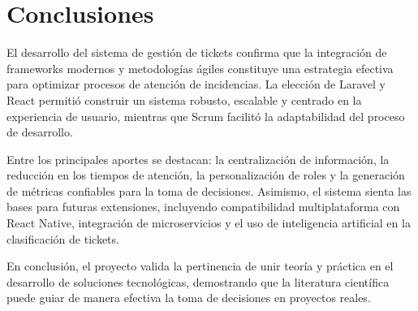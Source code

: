 \section{Conclusiones}
El desarrollo del sistema de gestión de tickets confirma que la integración de frameworks modernos y metodologías ágiles constituye una estrategia efectiva para optimizar procesos de atención de incidencias. La elección de Laravel y React permitió construir un sistema robusto, escalable y centrado en la experiencia de usuario, mientras que Scrum facilitó la adaptabilidad del proceso de desarrollo.

Entre los principales aportes se destacan: la centralización de información, la reducción en los tiempos de atención, la personalización de roles y la generación de métricas confiables para la toma de decisiones. Asimismo, el sistema sienta las bases para futuras extensiones, incluyendo compatibilidad multiplataforma con React Native, integración de microservicios y el uso de inteligencia artificial en la clasificación de tickets.

En conclusión, el proyecto valida la pertinencia de unir teoría y práctica en el desarrollo de soluciones tecnológicas, demostrando que la literatura científica puede guiar de manera efectiva la toma de decisiones en proyectos reales.